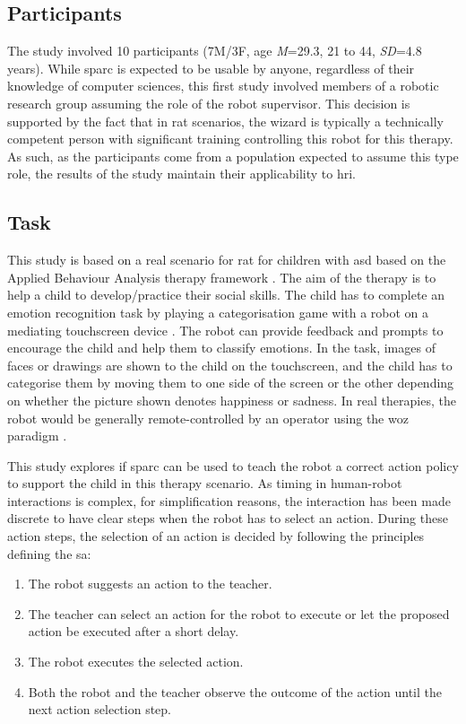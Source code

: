 \subsection{Participants}

The study involved 10 participants (7M/3F, age \textit{M}=29.3, 21 to 44, \textit{SD}=4.8 years). While \gls{sparc} is expected to be usable by anyone, regardless of their knowledge of computer sciences, this first study involved members of a robotic research group assuming the role of the robot supervisor. This decision is supported by the fact that in \gls{rat} scenarios, the wizard is typically a technically competent person with significant training controlling this robot for this therapy. As such, as the participants come from a population expected to assume this type role, the results of the study maintain their applicability to \gls{hri}.

\subsection{Task}

This study is based on a real scenario for \gls{rat} for children with \gls{asd} based on the Applied Behaviour Analysis therapy framework \citep{cooper2007applied}. The aim of the therapy is to help a child to develop/practice their social skills. The child has to complete an emotion recognition task by playing a categorisation game with a robot on a mediating touchscreen device \citep{baxter2012touchscreen}. The robot can provide feedback and prompts to encourage the child and help them to classify emotions. In the task, images of faces or drawings are shown to the child on the touchscreen, and the child has to categorise them by moving them to one side of the screen or the other depending on whether the picture shown denotes happiness or sadness. In real therapies, the robot would be generally remote-controlled by an operator using the \gls{woz} paradigm \cite{riek2012wizard}.%

This study explores if \gls{sparc} can be used to teach the robot a correct action policy to support the child in this therapy scenario. As timing in human-robot interactions is complex, for simplification reasons, the interaction has been made discrete to have clear steps when the robot has to select an action. During these action steps, the selection of an action is decided by following the principles defining the \gls{sa}:
\begin{enumerate}
	\item The robot suggests an action to the teacher.
	\item The teacher can select an action for the robot to execute or let the proposed action be executed after a short delay.
	\item The robot executes the selected action.
	\item Both the robot and the teacher observe the outcome of the action until the next action selection step.
\end{enumerate}

